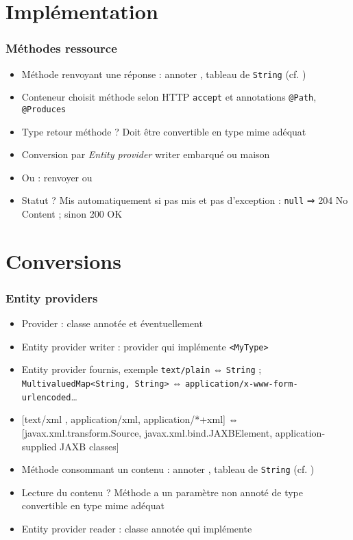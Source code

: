 \documentclass[english, french]{beamer}
\begin{document}
\section{Implémentation}
\begin{frame}
	\frametitle{Méthodes ressource}
	\begin{itemize}
		\item Méthode renvoyant une réponse : annoter , tableau de \texttt{String} (cf. )
		\item Conteneur choisit méthode selon HTTP \texttt{accept} et annotations \texttt{@Path}, \texttt{@Produces}
		\item Type retour méthode ? \pause Doit être convertible en type mime adéquat \pause
		\item Conversion par \emph{Entity provider} \og{}writer\fg{} embarqué ou maison
		\item Ou : renvoyer  {\tiny ou }
		\item Statut ? \pause Mis automatiquement si pas mis {\tiny et pas d’exception} : \texttt{null} ⇒ 204 No Content ; sinon 200 OK
	\end{itemize}
\end{frame}

\section{Conversions}
\begin{frame}
	\frametitle{Entity providers}
	\begin{itemize}
		\item Provider : classe annotée  et {\tiny éventuellement} 
		\item Entity provider \og{}writer\fg{} : provider qui implémente \texttt{<MyType>}
		\item Entity provider fournis, exemple \texttt{text/plain} ⇔ \texttt{String} ; \texttt{MultivaluedMap<String, String>} ⇔ \texttt{application/x-www-form-urlencoded}…
		\item{} {\tiny [text/xml , application/xml, application/*+xml] ⇔ [javax.xml.transform.Source, javax.xml.bind.JAXBElement, application-supplied JAXB classes]} %
		\item Méthode consommant un contenu : annoter , tableau de \texttt{String} (cf. )
		\item Lecture du contenu ? \pause Méthode a un paramètre non annoté de type convertible en type mime adéquat \pause
		\item Entity provider \og{}reader\fg{} : classe annotée  qui implémente 
	\end{itemize}
\end{frame}
\end{document}
